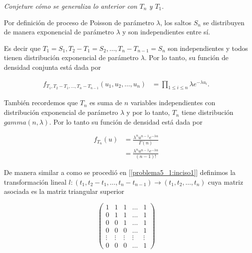 \emph{
	Conjeture c\'omo se  generaliza lo anterior con $T_n$ y $T_1$.
}

Por definición de proceso de Poisson de parámetro $\lambda$, los saltos $S_n$ se distribuyen
de manera exponencial de parámetro $\lambda$ y son independientes entre sí.\pn

Es decir que $T_1 = S_1, T_2 - T_1 = S_2, \dots, T_n - T_{n-1} = S_n$ son independientes y 
todos tienen distribución exponencial de parámetro $\lambda$. Por lo tanto, su función
de densidad conjunta está dada por

\begin{align}
    f_{T_1, T_2 - T_1, \dots, T_n - T_{n-1}}(u_1, u_2, \dots, u_n)  &=  
    \prod_{1 \leq i \leq n} \lambda e^{-\lambda u_i}. \label{problema5_1:distribucion_conjunta}
\end{align}\pn

También recordemos que $T_n$ es suma de $n$ variables independientes con distribución exponencial de
parámetro $\lambda$ y por lo tanto, $T_n$ tiene distribución $gamma(n, \lambda)$. Por lo tanto su 
función de densidad está dada por

\begin{align}
    f_{T_n}(u)  &=  \frac{ \lambda^{n} u^{n-1} e^{- \lambda u}}{\Gamma(n)} \\
                &=  \frac{ \lambda^{n} u^{n-1} e^{- \lambda u}}{(n-1)!}
\end{align}\pn

De manera similar a como se procedió en [\ref{problema5_1:inciso1}] definimos la transformación lineal 
$l: (t_1, t_2 - t_1, \dots, t_n - t_{n-1}) \longrightarrow (t_1, t_2, \dots, t_n)$ cuya matriz asociada es la 
matriz triangular superior

\[
    \left(
            \begin{array}{ccccc}
                    1       &   1       & 1      &\dots   &  1      \\
                    0       &   1       & 1      &\dots   &  1      \\
                    0       &   0       & 1      &\dots   &  1      \\
                    0       &   0       & 0      &\dots   &  1      \\
                    \vdots  &   \vdots  & \vdots &\vdots  & \vdots  \\
                    0       &   0       & 0      &\dots   &  1
            \end{array}
    \right)
\]\pn

